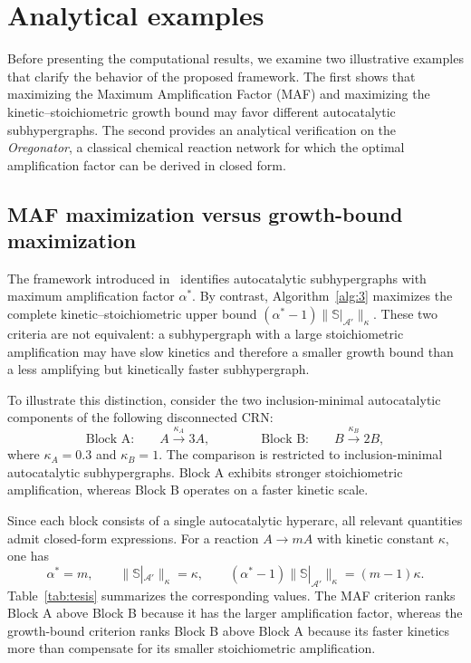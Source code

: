 \documentclass[a4paper,11pt,reqno]{amsart}
\begin{document}
\section{Analytical examples}\label{sec:examples}

Before presenting the computational results, we examine two illustrative
examples that clarify the behavior of the proposed framework. The first shows
that maximizing the Maximum Amplification Factor (MAF) and maximizing the
kinetic--stoichiometric growth bound may favor different autocatalytic
subhypergraphs. The second provides an analytical verification on the
\emph{Oregonator}, a classical chemical reaction network for which the optimal
amplification factor can be derived in closed form.

\subsection{MAF maximization versus growth-bound maximization}
\label{sec:tesis}

The framework introduced in~\cite{gonzalez2024maf} identifies
autocatalytic subhypergraphs with maximum amplification factor $\alpha^*$.
By contrast, Algorithm~\ref{alg:3} maximizes the complete
kinetic--stoichiometric upper bound
$(\alpha^*-1)\|\mathbb S|_{\mathcal A'}\|_{\kappa}$. These two criteria are
not equivalent: a subhypergraph with a large stoichiometric amplification may
have slow kinetics and therefore a smaller growth bound than a less amplifying
but kinetically faster subhypergraph.

To illustrate this distinction, consider the two inclusion-minimal
autocatalytic components of the following disconnected CRN:
$$
\text{Block A:}\qquad
A\xrightarrow{\kappa_A}3A,
\qquad\qquad
\text{Block B:}\qquad
B\xrightarrow{\kappa_B}2B,
$$
where $\kappa_A=0.3$ and $\kappa_B=1$. The comparison is restricted to
inclusion-minimal autocatalytic subhypergraphs. Block A exhibits stronger
stoichiometric amplification, whereas Block B operates on a faster kinetic
scale.

Since each block consists of a single autocatalytic hyperarc, all relevant
quantities admit closed-form expressions. For a reaction
$A\rightarrow mA$ with kinetic constant $\kappa$, one has
$$
\alpha^*=m,\qquad
\|\mathbb S|_{\mathcal A'}\|_{\kappa}=\kappa,\qquad
(\alpha^*-1)\|\mathbb S|_{\mathcal A'}\|_{\kappa}=(m-1)\kappa.
$$
Table~\ref{tab:tesis} summarizes the corresponding values. The MAF criterion
ranks Block A above Block B because it has the larger amplification factor,
whereas the growth-bound criterion ranks Block B above Block A because its
faster kinetics more than compensate for its smaller stoichiometric
amplification.
\end{document}

